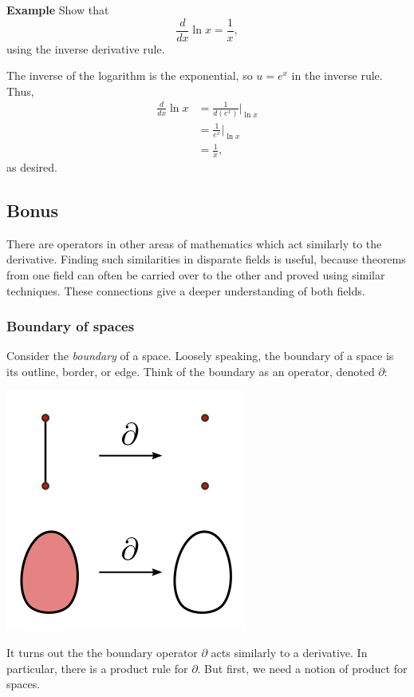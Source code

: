\documentclass[twoside,openright,titlepage,a4paper]{book}
\begin{document}
\begin{sloppypar}
\textbf{Example} Show that \[ \frac{d}{dx} \ln x = \frac{1}{x}, \] using the inverse derivative rule. 
\begin{examplebox}
The inverse of the logarithm is the exponential, so $u = e^x$ in the inverse rule. Thus,
\begin{align*}
\frac{d}{dx} \ln x &= \frac{1}{d(e^x)} \bigg|_{\ln x} \\
&= \frac{1}{e^x} \bigg|_{\ln x} \\
&= \frac{1}{x},
\end{align*}
as desired.	
\end{examplebox}

\subsection{Bonus}

There are operators in other areas of mathematics which act similarly to the derivative. Finding such similarities in disparate fields is useful, because theorems from one field can often be carried over to the other and proved using similar techniques. These connections give a deeper understanding of both fields.

\subsubsection{Boundary of spaces}

Consider the \textit{boundary} of a space. Loosely speaking, the boundary of a space is its outline, border, or edge. Think of the boundary as an operator, denoted $\partial$:
\begin{center}\includegraphics[scale=0.6]{Boundary}\end{center}

It turns out the the boundary operator $\partial$ acts similarly to a derivative. In particular, there is a product rule for $\partial$. But first, we need a notion of product for spaces.


\end{sloppypar}
\end{document}

